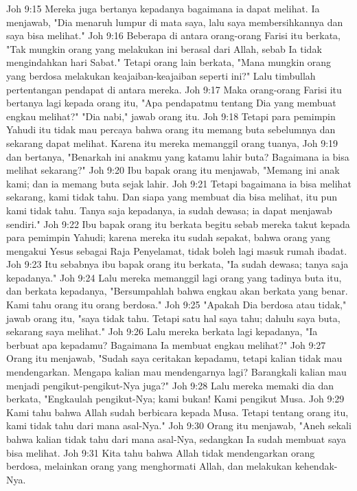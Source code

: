 Joh 9:15  Mereka juga bertanya kepadanya bagaimana ia dapat melihat. Ia menjawab, "Dia menaruh lumpur di mata saya, lalu saya membersihkannya dan saya bisa melihat."
Joh 9:16  Beberapa di antara orang-orang Farisi itu berkata, "Tak mungkin orang yang melakukan ini berasal dari Allah, sebab Ia tidak mengindahkan hari Sabat." Tetapi orang lain berkata, "Mana mungkin orang yang berdosa melakukan keajaiban-keajaiban seperti ini?" Lalu timbullah pertentangan pendapat di antara mereka.
Joh 9:17  Maka orang-orang Farisi itu bertanya lagi kepada orang itu, "Apa pendapatmu tentang Dia yang membuat engkau melihat?" "Dia nabi," jawab orang itu.
Joh 9:18  Tetapi para pemimpin Yahudi itu tidak mau percaya bahwa orang itu memang buta sebelumnya dan sekarang dapat melihat. Karena itu mereka memanggil orang tuanya,
Joh 9:19  dan bertanya, "Benarkah ini anakmu yang katamu lahir buta? Bagaimana ia bisa melihat sekarang?"
Joh 9:20  Ibu bapak orang itu menjawab, "Memang ini anak kami; dan ia memang buta sejak lahir.
Joh 9:21  Tetapi bagaimana ia bisa melihat sekarang, kami tidak tahu. Dan siapa yang membuat dia bisa melihat, itu pun kami tidak tahu. Tanya saja kepadanya, ia sudah dewasa; ia dapat menjawab sendiri."
Joh 9:22  Ibu bapak orang itu berkata begitu sebab mereka takut kepada para pemimpin Yahudi; karena mereka itu sudah sepakat, bahwa orang yang mengakui Yesus sebagai Raja Penyelamat, tidak boleh lagi masuk rumah ibadat.
Joh 9:23  Itu sebabnya ibu bapak orang itu berkata, "Ia sudah dewasa; tanya saja kepadanya."
Joh 9:24  Lalu mereka memanggil lagi orang yang tadinya buta itu, dan berkata kepadanya, "Bersumpahlah bahwa engkau akan berkata yang benar. Kami tahu orang itu orang berdosa."
Joh 9:25  "Apakah Dia berdosa atau tidak," jawab orang itu, "saya tidak tahu. Tetapi satu hal saya tahu; dahulu saya buta, sekarang saya melihat."
Joh 9:26  Lalu mereka berkata lagi kepadanya, "Ia berbuat apa kepadamu? Bagaimana Ia membuat engkau melihat?"
Joh 9:27  Orang itu menjawab, "Sudah saya ceritakan kepadamu, tetapi kalian tidak mau mendengarkan. Mengapa kalian mau mendengarnya lagi? Barangkali kalian mau menjadi pengikut-pengikut-Nya juga?"
Joh 9:28  Lalu mereka memaki dia dan berkata, "Engkaulah pengikut-Nya; kami bukan! Kami pengikut Musa.
Joh 9:29  Kami tahu bahwa Allah sudah berbicara kepada Musa. Tetapi tentang orang itu, kami tidak tahu dari mana asal-Nya."
Joh 9:30  Orang itu menjawab, "Aneh sekali bahwa kalian tidak tahu dari mana asal-Nya, sedangkan Ia sudah membuat saya bisa melihat.
Joh 9:31  Kita tahu bahwa Allah tidak mendengarkan orang berdosa, melainkan orang yang menghormati Allah, dan melakukan kehendak-Nya.
